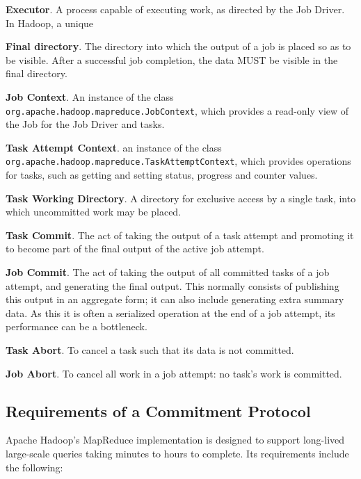 \documentclass[conference]{IEEEtran}
\begin{document}
\textbf{Executor}.
A process capable of executing work, as directed by the Job Driver.
In Hadoop, a unique

\textbf{Final directory}.
The directory into which the output of a job is placed
so as to be visible.
After a successful job completion, the data MUST be visible in the final directory.


\textbf{Job Context}.
An instance of the class \texttt{org.apache.hadoop.mapreduce.JobContext},
which provides a read-only view of the Job for the Job Driver and tasks.

\textbf{Task Attempt Context}.
an instance of the class
\texttt{org.apache.hadoop.mapreduce.TaskAttemptContext},
which provides operations for tasks, such as getting and setting status,
progress and counter values.

\textbf{Task Working Directory}.
A directory for exclusive access by a single task,
into which uncommitted work may be placed.

\textbf{Task Commit}.
The act of taking the output of a task attempt and promoting it
to become part of the final output of the active job
attempt.

\textbf{Job Commit}.
The act of taking the output of all committed tasks of a job attempt,
and generating the final output.
This normally consists of publishing this output in an aggregate form;
it can also include generating extra summary data.
As this it is often a serialized operation at the end of a job attempt,
its performance can be a bottleneck.

\textbf{Task Abort}.
To cancel a task such that its data is not committed.

\textbf{Job Abort}.
To cancel all work in a job attempt: no task's work is committed.


\subsection{Requirements of a Commitment Protocol}
\label{subsec:requirementsOfACommitmentProtocol}

Apache Hadoop's MapReduce implementation is designed to support long-lived
large-scale queries taking minutes to hours to complete.
Its requirements include the following:
\end{document}
